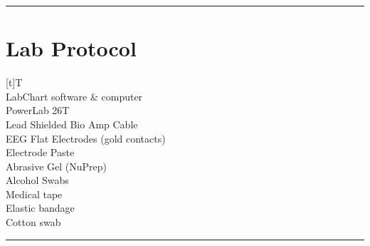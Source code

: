 \documentclass[letterpaper,10pt,english]{jupyterBook}
\begin{document}
\sphinxAtStartPar
{}


\bigskip\hrule\bigskip



\section{Lab Protocol}
\label{\detokenize{EEG:lab-protocol}}

\begin{savenotes}\sphinxattablestart
\sphinxthistablewithglobalstyle
\centering
\begin{tabulary}{\linewidth}[t]{T}
\sphinxtoprule
\sphinxstyletheadfamily 
\sphinxAtStartPar
{}
\\
\sphinxmidrule
\sphinxtableatstartofbodyhook
\sphinxAtStartPar
LabChart software \& computer
\\
\sphinxhline
\sphinxAtStartPar
PowerLab 26T
\\
\sphinxhline
{} Lead Shielded Bio Amp Cable
\\
\sphinxhline
\sphinxAtStartPar
EEG Flat Electrodes (gold contacts)
\\
\sphinxhline
\sphinxAtStartPar
Electrode Paste
\\
\sphinxhline
\sphinxAtStartPar
Abrasive Gel (NuPrep)
\\
\sphinxhline
\sphinxAtStartPar
Alcohol Swabs
\\
\sphinxhline
\sphinxAtStartPar
Medical tape
\\
\sphinxhline
\sphinxAtStartPar
Elastic bandage
\\
\sphinxhline
\sphinxAtStartPar
Cotton swab
\\
\sphinxbottomrule
\end{tabulary}
\sphinxtableafterendhook\par
\sphinxattableend\end{savenotes}


\bigskip\hrule\bigskip
\end{document}
